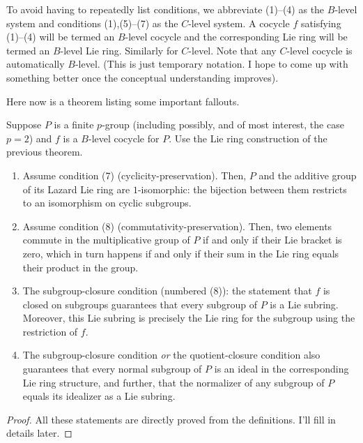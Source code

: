 \documentclass[10pt]{amsart}
\begin{document}
To avoid having to repeatedly list conditions, we abbreviate (1)--(4)
as the $B$-level system and conditions (1),(5)--(7) as the $C$-level
system. A cocycle $f$ satisfying (1)--(4) will be termed an $B$-level
cocycle and the corresponding Lie ring will be termed an $B$-level Lie
ring. Similarly for $C$-level. Note that any $C$-level cocycle is
automatically $B$-level. (This is just temporary notation. I hope to
come up with something better once the conceptual understanding improves).

Here now is a theorem listing some important fallouts.

\begin{theorem}\label{lazardgrouptoringmore}
  Suppose $P$ is a finite $p$-group (including possibly, and of most
  interest, the case $p = 2$) and $f$ is a $B$-level cocycle for
  $P$. Use the Lie ring construction of the previous theorem.

  \begin{enumerate}
  \item Assume condition (7) (cyclicity-preservation). Then, $P$ and
    the additive group of its Lazard Lie ring are $1$-isomorphic: the
    bijection between them restricts to an isomorphism on cyclic
    subgroups.
  \item Assume condition (8) (commutativity-preservation). Then, two
    elements commute in the multiplicative group of $P$ if and only if
    their Lie bracket is zero, which in turn happens if and only if
    their sum in the Lie ring equals their product in the group.
  \item The subgroup-closure condition (numbered (8)): the statement
    that $f$ is closed on subgroups guarantees that every subgroup of
    $P$ is a Lie subring. Moreover, this Lie subring is precisely the
    Lie ring for the subgroup using the restriction of $f$.
  \item The subgroup-closure condition {\em or} the quotient-closure
    condition also guarantees that every normal subgroup of $P$ is an
    ideal in the corresponding Lie ring structure, and further, that
    the normalizer of any subgroup of $P$ equals its idealizer as a
    Lie subring.
  \end{enumerate}
\end{theorem}

\begin{proof}
  All these statements are directly proved from the definitions. I'll
  fill in details later.
\end{proof}
\end{document}
